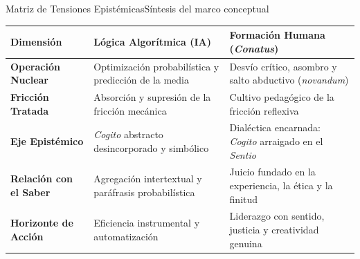 \documentclass[aspectratio=169,11pt]{beamer}
\begin{document}
\begin{frame}{Matriz de Tensiones Epistémicas}{Síntesis del marco conceptual}
  \centering
  \scriptsize
  \renewcommand{\arraystretch}{1.3}
  \begin{tabular}{p{3.0cm} p{4.5cm} p{5.0cm}}
    \toprule
    \textbf{Dimensión} & \textbf{Lógica Algorítmica (IA)} &
    \textbf{Formación Humana (\textit{Conatus})} \\
    \midrule
    \textbf{Operación Nuclear} & Optimización probabilística y
    predicción de la media & Desvío crítico, asombro y salto
    abductivo (\textit{novandum}) \\
    \textbf{Fricción Tratada} & Absorción y supresión de la fricción
    mecánica & Cultivo pedagógico de la fricción reflexiva \\
    \textbf{Eje Epistémico} & \textit{Cogito} abstracto
    desincorporado y simbólico & Dialéctica encarnada:
    \textit{Cogito} arraigado en el \textit{Sentio} \\
    \textbf{Relación con el Saber} & Agregación intertextual y
    paráfrasis probabilística & Juicio fundado en la experiencia, la
    ética y la finitud \\
    \textbf{Horizonte de Acción} & Eficiencia instrumental y
    automatización & Liderazgo con sentido, justicia y creatividad genuina \\
    \bottomrule
  \end{tabular}
\end{frame}
\end{document}
